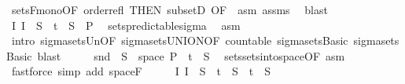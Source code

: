 \begin{isabellebody}
\ sets{\isacharunderscore}{\kern0pt}F{\isacharunderscore}{\kern0pt}mono{\isacharbrackleft}{\kern0pt}OF\ order{\isacharunderscore}{\kern0pt}refl{\isacharcomma}{\kern0pt}\ THEN\ subsetD{\isacharcomma}{\kern0pt}\ OF\ {\isacharunderscore}{\kern0pt}\ asm{\isacharbrackright}{\kern0pt}\ assms{\isacharparenleft}{\kern0pt}{}{\isacharparenright}{\kern0pt}\ \isamarkupfalse%
\ blast\isanewline
\ \ \isamarkupfalse%
\ {\isachardoublequoteopen}{\isacharparenleft}{\kern0pt}{\isasymUnion}I{\isasymin}{\isasymI}{\isachardot}{\kern0pt}\ I\ {\isasymtimes}\ S{\isacharparenright}{\kern0pt}\ {\isasymunion}\ {\isacharbraceleft}{\kern0pt}t\ {\isasymtimes}\ S\ {\isasymin}\ {\isasymSigma}\isactrlsub P{\isachardoublequoteclose}\ \isamarkupfalse%
\ sets{\isacharunderscore}{\kern0pt}predictable{\isacharunderscore}{\kern0pt}sigma\ \isamarkupfalse%
\ asm\ \isamarkupfalse%
\ {\isacharparenleft}{\kern0pt}intro\ sigma{\isacharunderscore}{\kern0pt}sets{\isacharunderscore}{\kern0pt}Un{\isacharbrackleft}{\kern0pt}OF\ sigma{\isacharunderscore}{\kern0pt}sets{\isacharunderscore}{\kern0pt}UNION{\isacharbrackleft}{\kern0pt}OF\ countable{\isacharbrackright}{\kern0pt}\ sigma{\isacharunderscore}{\kern0pt}sets{\isachardot}{\kern0pt}Basic{\isacharbrackright}{\kern0pt}\ sigma{\isacharunderscore}{\kern0pt}sets{\isachardot}{\kern0pt}Basic{\isacharparenright}{\kern0pt}\ blast{\isacharplus}{\kern0pt}\isanewline
\ \ \isamarkupfalse%
\ \isamarkupfalse%
\ {\isachardoublequoteopen}snd\ {\isacharminus}{\kern0pt}{\isacharbackquote}{\kern0pt}\ S\ {\isasyminter}\ space\ {\isasymSigma}\isactrlsub P\ {\isacharequal}{\kern0pt}\ {\isacharbraceleft}{\kern0pt}t\ {\isasymtimes}\ S{\isachardoublequoteclose}\ \isamarkupfalse%
\ sets{\isachardot}{\kern0pt}sets{\isacharunderscore}{\kern0pt}into{\isacharunderscore}{\kern0pt}space{\isacharbrackleft}{\kern0pt}OF\ asm{\isacharbrackright}{\kern0pt}\ \isamarkupfalse%
\ {\isacharparenleft}{\kern0pt}fastforce\ simp\ add{\isacharcolon}{\kern0pt}\ space{\isacharunderscore}{\kern0pt}F{\isacharparenright}{\kern0pt}\isanewline
\ \ \isamarkupfalse%
\ \isamarkupfalse%
\ {\isachardoublequoteopen}{\isacharparenleft}{\kern0pt}{\isasymUnion}I{\isasymin}{\isasymI}{\isachardot}{\kern0pt}\ I\ {\isasymtimes}\ S{\isacharparenright}{\kern0pt}\ {\isasymunion}\ {\isacharbraceleft}{\kern0pt}t\ {\isasymtimes}\ S\ {\isacharequal}{\kern0pt}\ {\isacharbraceleft}{\kern0pt}t\ {\isasymtimes}\ S{\isachardoublequoteclose}\ \isamarkupfalse%

\end{isabellebody}
